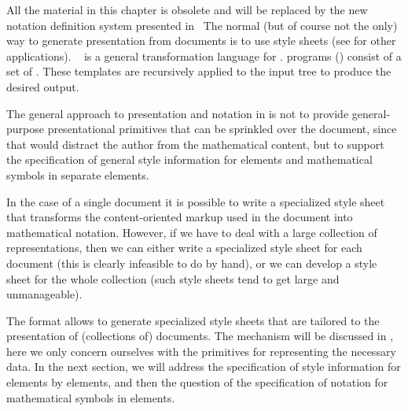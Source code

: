 \begin{omgroup}[creators=miko,short={Notation and Presentation},id=pres]
\begin{module}[id=presintro]
\begin{oldpart}{All the material in this chapter is obsolete and will be replaced by the
    new notation definition system presented in~\cite{KMR:NoLMD08}}
The normal (but of course not the only) way to generate presentation from {\xml} documents
is to use {\xslt} style sheets (see {} for other
applications).  {\xslt}~\cite{Clark:xslt99} is a general transformation language for
{\xml}.  {\xslt} programs () consist of a
set of . These templates are recursively applied to the input tree to produce
the desired output.

The general approach to presentation and notation in {\omdoc} is not to provide
general-purpose presentational primitives that can be sprinkled over the document, since
that would distract the author from the mathematical content, but to support the
specification of general style information for {\omdoc} elements and mathematical symbols
in separate elements.

In the case of a single {\omdoc} document it is possible to write a specialized style
sheet that transforms the content-oriented markup used in the document into mathematical
notation. However, if we have to deal with a large collection of {\omdoc} representations,
then we can either write a specialized style sheet for each document (this is clearly
infeasible to do by hand), or we can develop a style sheet for the whole collection (such
style sheets tend to get large and unmanageable).

The {\omdoc} format allows to generate specialized style sheets that are tailored to the
presentation of (collections of) {\omdoc} documents. The mechanism will be discussed in
{}, here we only concern ourselves with the {\omdoc}
primitives for representing the necessary data. In the next section, we will address the
specification of style information for {\omdoc} elements by {} elements,
and then the question of the specification of notation for mathematical symbols in
{} elements.
\end{oldpart}
\end{module}


\end{omgroup}
